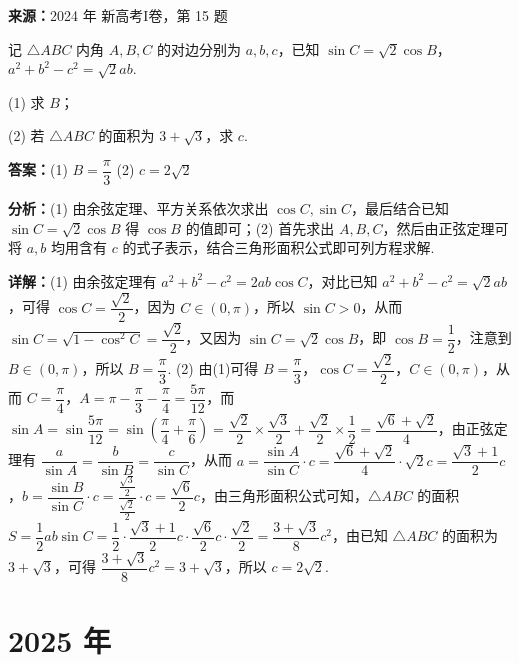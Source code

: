 \begin{question}[points=13]
\textbf{来源：}2024 年 新高考I卷，第 15 题\par
记 $\triangle ABC$ 内角 $A,B,C$ 的对边分别为 $a,b,c$，已知 $\sin C=\sqrt{2}\cos B$，$a^2+b^2-c^2=\sqrt{2}ab$.

(1) 求 $B$；

(2) 若 $\triangle ABC$ 的面积为 $3+\sqrt{3}$，求 $c$.
\begin{solution}
\textbf{答案：}(1) $B=\dfrac{\pi}{3}$ (2) $c=2\sqrt{2}$

\textbf{分析：}(1) 由余弦定理、平方关系依次求出 $\cos C,\sin C$，最后结合已知 $\sin C=\sqrt{2}\cos B$ 得 $\cos B$ 的值即可；(2) 首先求出 $A,B,C$，然后由正弦定理可将 $a,b$ 均用含有 $c$ 的式子表示，结合三角形面积公式即可列方程求解.

\textbf{详解：}(1) 由余弦定理有 $a^2+b^2-c^2=2ab\cos C$，对比已知 $a^2+b^2-c^2=\sqrt{2}ab$，可得 $\cos C=\dfrac{\sqrt{2}}{2}$，因为 $C\in(0,\pi)$，所以 $\sin C>0$，从而 $\sin C=\sqrt{1-\cos^2 C}=\dfrac{\sqrt{2}}{2}$，又因为 $\sin C=\sqrt{2}\cos B$，即 $\cos B=\dfrac{1}{2}$，注意到 $B\in(0,\pi)$，所以 $B=\dfrac{\pi}{3}$.
(2) 由(1)可得 $B=\dfrac{\pi}{3}$，$\cos C=\dfrac{\sqrt{2}}{2}$，$C\in(0,\pi)$，从而 $C=\dfrac{\pi}{4}$，$A=\pi-\dfrac{\pi}{3}-\dfrac{\pi}{4}=\dfrac{5\pi}{12}$，而 $\sin A=\sin\dfrac{5\pi}{12}=\sin\left(\dfrac{\pi}{4}+\dfrac{\pi}{6}\right)=\dfrac{\sqrt{2}}{2}\times\dfrac{\sqrt{3}}{2}+\dfrac{\sqrt{2}}{2}\times\dfrac{1}{2}=\dfrac{\sqrt{6}+\sqrt{2}}{4}$，由正弦定理有 $\dfrac{a}{\sin A}=\dfrac{b}{\sin B}=\dfrac{c}{\sin C}$，从而 $a=\dfrac{\sin A}{\sin C}\cdot c=\dfrac{\sqrt{6}+\sqrt{2}}{4}\cdot\sqrt{2}c=\dfrac{\sqrt{3}+1}{2}c$，$b=\dfrac{\sin B}{\sin C}\cdot c=\dfrac{\frac{\sqrt{3}}{2}}{\frac{\sqrt{2}}{2}}\cdot c=\dfrac{\sqrt{6}}{2}c$，由三角形面积公式可知，$\triangle ABC$ 的面积 $S=\dfrac{1}{2}ab\sin C=\dfrac{1}{2}\cdot\dfrac{\sqrt{3}+1}{2}c\cdot\dfrac{\sqrt{6}}{2}c\cdot\dfrac{\sqrt{2}}{2}=\dfrac{3+\sqrt{3}}{8}c^2$，由已知 $\triangle ABC$ 的面积为 $3+\sqrt{3}$，可得 $\dfrac{3+\sqrt{3}}{8}c^2=3+\sqrt{3}$，所以 $c=2\sqrt{2}$.
\end{solution}
\end{question}

\section*{2025 年}

